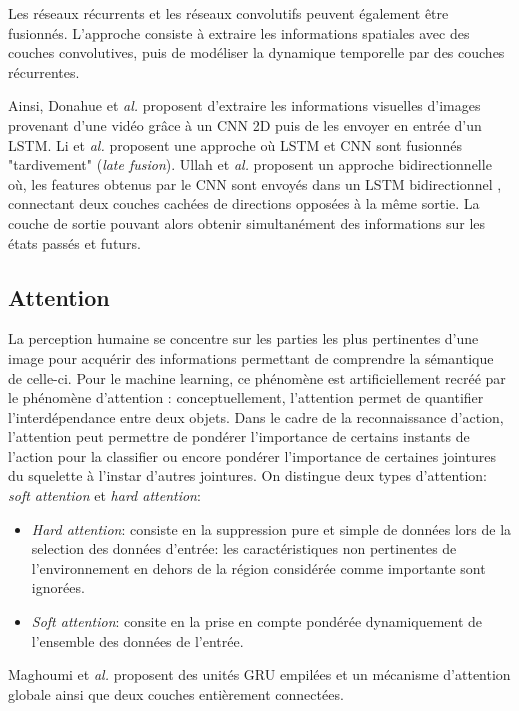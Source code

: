 Les réseaux récurrents et les réseaux convolutifs peuvent également être fusionnés. L'approche consiste à extraire les informations spatiales avec des couches convolutives, puis de modéliser la dynamique temporelle par des couches récurrentes.

Ainsi, Donahue et\textit{ al.} \cite{donahue2015long} proposent d'extraire les informations visuelles d'images provenant d'une vidéo grâce à un CNN 2D puis de les envoyer en entrée d'un LSTM.
Li et\textit{ al.} \cite{li2017skeleton} proposent une approche où LSTM et CNN sont fusionnés "tardivement" (\textit{late fusion}). Ullah et\textit{ al.} \cite{ullah2017action} proposent un approche bidirectionnelle où, les features obtenus par le CNN sont envoyés dans un LSTM bidirectionnel \cite{Schuster97bidirectionalrecurrent}, connectant deux couches cachées de directions opposées à la même sortie. La couche de sortie pouvant alors obtenir simultanément des informations sur les états passés et futurs.

\subsection{Attention}
 La perception humaine se concentre sur les parties les plus pertinentes d'une image pour acquérir des informations permettant de comprendre la sémantique de celle-ci. Pour le machine learning, ce phénomène est artificiellement recréé  par le phénomène d'attention \cite{2017arXiv170603762V}: conceptuellement, l'attention permet de quantifier l'interdépendance entre deux objets. Dans le cadre de la reconnaissance d'action, l'attention peut permettre de pondérer l'importance de certains instants de l'action pour la classifier ou encore pondérer l'importance de certaines jointures du squelette à l'instar d'autres jointures.
 On distingue deux types d'attention: \textit{soft attention} et \textit{hard attention}:
 \begin{itemize}
     \item \textit{Hard attention}: consiste en la suppression pure et simple de données lors de la selection des données d'entrée: les caractéristiques non pertinentes de l'environnement en dehors de la région considérée comme importante sont ignorées.
     \item \textit{Soft attention}: consite en la prise en compte pondérée dynamiquement de l'ensemble des données de l'entrée.
 \end{itemize}
 
Maghoumi et\textit{ al.}\cite{maghoumi2019deepgru} proposent des unités GRU empilées et un mécanisme d'attention globale ainsi que deux couches entièrement connectées.

